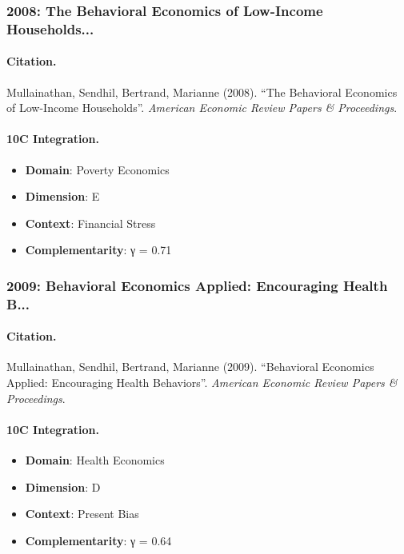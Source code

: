 \subsubsection{2008: The Behavioral Economics of Low-Income Households...}

\paragraph{Citation.}
Mullainathan, Sendhil, Bertrand, Marianne (2008). ``The Behavioral Economics of Low-Income Households''. \textit{American Economic Review Papers & Proceedings}.

\paragraph{10C Integration.}
\begin{itemize}[nosep]
  \item \textbf{Domain}: Poverty Economics
  \item \textbf{Dimension}: E
  \item \textbf{Context}: Financial Stress
  \item \textbf{Complementarity}: γ = 0.71
\end{itemize}


\subsubsection{2009: Behavioral Economics Applied: Encouraging Health B...}

\paragraph{Citation.}
Mullainathan, Sendhil, Bertrand, Marianne (2009). ``Behavioral Economics Applied: Encouraging Health Behaviors''. \textit{American Economic Review Papers & Proceedings}.

\paragraph{10C Integration.}
\begin{itemize}[nosep]
  \item \textbf{Domain}: Health Economics
  \item \textbf{Dimension}: D
  \item \textbf{Context}: Present Bias
  \item \textbf{Complementarity}: γ = 0.64
\end{itemize}


